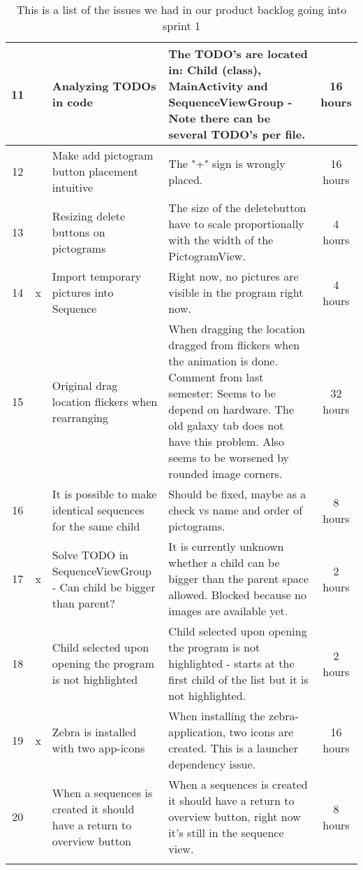 \begin{longtable} { | c | c | p{5cm} | p{5cm} | c | }
	11	& 		&	Analyzing TODOs in code	&	The TODO's are located in: Child (class), MainActivity and SequenceViewGroup - Note there can be several TODO's per file.		&	16 hours	\\\hline
	12	& 		&	Make add pictogram button placement intuitive	&	The "+" sign is wrongly placed.	&	16 hours 	\\\hline
	13	& 		&	Resizing delete buttons on pictograms	&	The size of the deletebutton have to scale proportionally with the width of the PictogramView.	&	4 hours	\\\hline
	14	& 	x	&	Import temporary pictures into Sequence	&	Right now, no pictures are visible in the program right now.	&	4 hours	\\\hline
	15	& 		&	Original drag location flickers when rearranging	&	When dragging the location dragged from flickers when the animation is done. Comment from last semester: Seems to be depend on hardware. The old galaxy tab does not have this problem. Also seems to be worsened by rounded image corners.	&	32 hours 	\\\hline
	16	& 		&	It is possible to make identical sequences for the same child	&	Should be fixed, maybe as a check vs name and order of pictograms.	&	8 hours	\\\hline
	17	& 	x	&	Solve TODO in SequenceViewGroup - Can child be bigger than parent?	&	It is currently unknown whether a child can be bigger than the parent space allowed. Blocked because no images are available yet.	&	2 hours	\\\hline
	18	& 		&	Child selected upon opening the program is not highlighted	&	Child selected upon opening the program is not highlighted - starts at the first child of the list but it is not highlighted.	&	2 hours	\\\hline
	19	& 	x	&	Zebra is installed with two app-icons	&	When installing the zebra-application, two icons are created. This is a launcher dependency issue.	&	16 hours\\\hline
	20	& 		&	When a sequences is created it should have a return to overview button	&	When a sequences is created it should have a return to overview button, right now it's still in the sequence view.	&	8 hours\\\hline
\caption{This is a list of the issues we had in our product backlog going into sprint 1}
\label{tab:spr1_prodblog}
\end{longtable}

